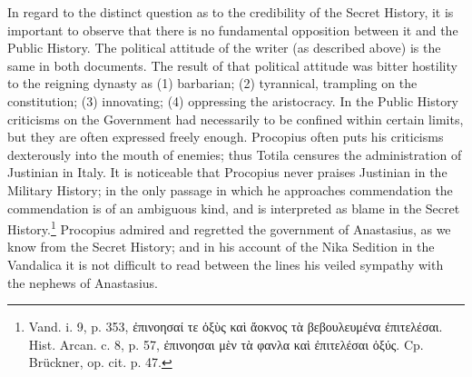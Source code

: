 In regard to the distinct question as to the credibility of the Secret History, it is important to observe that there is no fundamental opposition between it and the Public History. The political attitude of the writer (as described above) is the same in both documents. The result of that political attitude was bitter hostility to the reigning dynasty as (1) barbarian; (2) tyrannical, trampling on the constitution; (3) innovating; (4) oppressing the aristocracy. In the Public History criticisms on the Government had necessarily to be confined within certain limits, but they are often expressed freely enough. Procopius often puts his criticisms dexterously into the mouth of enemies; thus Totila censures the administration of Justinian in Italy. It is noticeable that Procopius never praises Justinian in the Military History; in the only passage in which he approaches commendation the commendation is of an ambiguous kind, and is interpreted as blame in the Secret History.\footnote{Vand. i. 9, p. 353, \textgreek{\texthebrew{ἐ}πινοησαί τε \texthebrew{ὀ}ξ\texthebrew{ὺ}ς κα\texthebrew{ὶ ἄ}οκνος τ\texthebrew{ὰ} βεβουλευμένα \texthebrew{ἐ}πιτελέσαι}. Hist. Arcan. c. 8, p. 57, \textgreek{\texthebrew{ἐ}πινοησαι μ\texthebrew{ὲ}ν τ\texthebrew{ὰ} φανλα κα\texthebrew{ὶ ἐ}πιτελέσαι \texthebrew{ὀ}ξύς}. Cp. Brückner, op. cit. p. 47.} Procopius admired and regretted the government of Anastasius, as we know from the Secret History; and in his account of the Nika Sedition in the Vandalica it is not difficult to read between the lines his veiled sympathy with the nephews of Anastasius.

